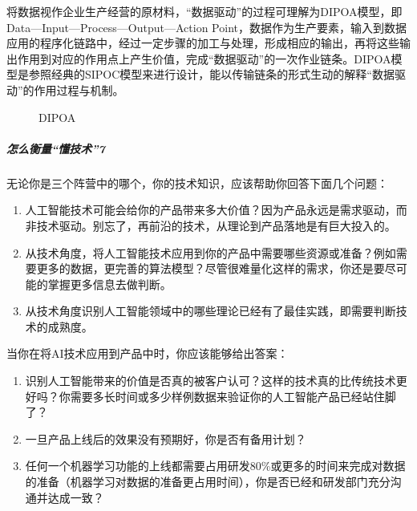 \documentclass[letterpaper,11pt,english]{sphinxmanual}
\begin{document}
将数据视作企业生产经营的原材料，“数据驱动”的过程可理解为DIPOA模型，即Data—Input—Process—Output—Action
Point，数据作为生产要素，输入到数据应用的程序化链路中，经过一定步骤的加工与处理，形成相应的输出，再将这些输出作用到对应的作用点上产生价值，完成“数据驱动”的一次作业链条。DIPOA模型是参照经典的SIPOC模型来进行设计，能以传输链条的形式生动的解释“数据驱动”的作用过程与机制。

\begin{figure}[H]
\centering
\capstart

\noindent{}
\caption{DIPOA}\label{\detokenize{chapter_introduction/AI_PM:id53}}\end{figure}


\subparagraph{怎么衡量“懂技术”7\sphinxfootnotemark[237]}
\label{\detokenize{chapter_introduction/AI_PM:id12}}%
\begin{footnotetext}[237]\sphinxAtStartFootnote
{}
%
\end{footnotetext}\ignorespaces 
无论你是三个阵营中的哪个，你的技术知识，应该帮助你回答下面几个问题：
\begin{enumerate}
%
\item {} 
人工智能技术可能会给你的产品带来多大价值？因为产品永远是需求驱动，而非技术驱动。别忘了，再前沿的技术，从理论到产品落地是有巨大投入的。

\item {} 
从技术角度，将人工智能技术应用到你的产品中需要哪些资源或准备？例如需要更多的数据，更完善的算法模型？尽管很难量化这样的需求，你还是要尽可能的掌握更多信息去做判断。

\item {} 
从技术角度识别人工智能领域中的哪些理论已经有了最佳实践，即需要判断技术的成熟度。

\end{enumerate}

当你在将AI技术应用到产品中时，你应该能够给出答案：
\begin{enumerate}
%
\item {} 
识别人工智能带来的价值是否真的被客户认可？这样的技术真的比传统技术更好吗？你需要多长时间或多少样例数据来验证你的人工智能产品已经站住脚了？

\item {} 
一旦产品上线后的效果没有预期好，你是否有备用计划？

\item {} 
任何一个机器学习功能的上线都需要占用研发80\%或更多的时间来完成对数据的准备（机器学习对数据的准备更占用时间），你是否已经和研发部门充分沟通并达成一致？

\end{enumerate}
\end{document}
